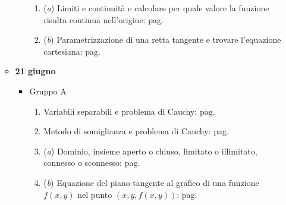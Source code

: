 \documentclass[a4paper]{article}
\begin{document}
\begin{itemize}
\begin{itemize}
\begin{itemize}
\begin{enumerate}[label*=Ex. \arabic*), leftmargin = 4em]
					\item (\emph{a}) Limiti e continuità e calcolare per quale valore la funzione risulta continua nell'origine: pag.~\hyperlink{
						exam: esame 03 marzo 2023 - Gruppo A - 4 esercizio (a)
					}{
					}
					
					\setcounter{enumi}{3}
					
					\item (\emph{b}) Parametrizzazione di una retta tangente e trovare l'equazione cartesiana: pag.~\hyperlink{
						exam: esame 03 marzo 2023 - Gruppo A - 4 esercizio (b)
					}{
					}
				\end{enumerate}
			\end{itemize}

			\item \textbf{21 giugno}
			\begin{itemize}
				\item Gruppo A
				\begin{enumerate}[label*=Ex. \arabic*), leftmargin = 4em]
					\item Variabili separabili e problema di Cauchy: pag.~\hyperlink{
						exam: esame 21 giugno 2023 - Gruppo A - 1 esercizio
					}{
					}

					\item Metodo di somiglianza e problema di Cauchy: pag.~\hyperlink{
						exam: esame 21 giugno 2023 - Gruppo A - 2 esercizio
					}{
					}

					\item (\emph{a}) Dominio, insieme aperto o chiuso, limitato o illimitato, connesso o sconnesso: pag.~\hyperlink{
						exam: esame 21 giugno 2023 - Gruppo A - 3 esercizio (a)
					}{
					}

					\setcounter{enumi}{2}

					\item (\emph{b}) Equazione del piano tangente al grafico di una funzione $f\left(x,y\right)$ nel punto $\left(x,y,f\left(x,y\right)\right)$: pag.~\hyperlink{
						exam: esame 21 giugno 2023 - Gruppo A - 3 esercizio (b)
					}{
					}


\end{enumerate}
\end{itemize}
\end{itemize}
\end{itemize}
\end{document}
